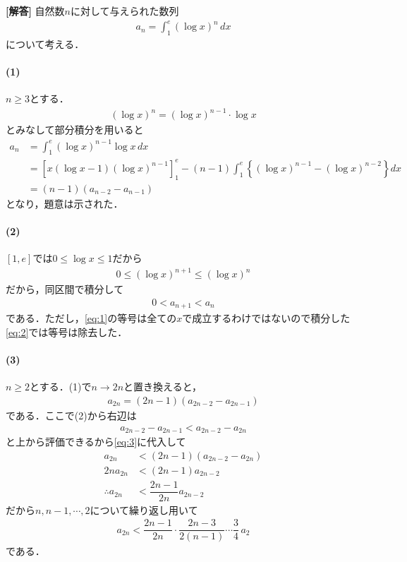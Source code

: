 \documentclass[../../main.tex]{subfiles}
\begin{document}
\begin{oframed}
  
\end{oframed}

{\bf [解答]}
自然数$n$に対して与えられた数列
\begin{align}
  a_n=\displaystyle\int_1^e(\log x)^n\,dx
\end{align}
について考える．

\paragraph{(1)}

$n\ge3$とする．
\begin{align}
  \left(\log x\right)^{n} =  \left(\log x\right)^{n-1}\cdot \log x
\end{align}
とみなして部分積分を用いると
\begin{align}
  a_{n}
  &=\int_1^e(\log x)^{n-1} \log x\, dx \\
  &=\left[x(\log x-1)\left(\log x\right)^{n-1}\right]_{1}^{e} - (n-1)\int_1^e\left\{\left(\log x\right)^{n-1}-\left(\log x\right)^{n-2}\right\}dx \\
  &= (n-1)\left(a_{n-2}-a_{n-1}\right)
\end{align}
となり，題意は示された．

\paragraph{(2)}

$[1,e]$では$0\le\log x\le1$だから
\begin{align}
  0 \le \left(\log x\right)^{n+1} \le \left(\log x\right)^{n} \label{eq:1}
\end{align}
だから，同区間で積分して
\begin{align}
  0 < a_{n+1} < a_{n} \label{eq:2}
\end{align}
である．ただし，\cref{eq:1}の等号は全ての$x$で成立するわけではないので積分した\cref{eq:2}では等号は除去した．

\paragraph{(3)}

$n\ge2$とする．(1)で$n\to 2n$と置き換えると，
\begin{align}
  a_{2n}=(2n-1)(a_{2n-2}-a_{2n-1}) \label{eq:3}
\end{align}
である．ここで(2)から右辺は
\begin{align}
  a_{2n-2}-a_{2n-1}<a_{2n-2}-a_{2n}
\end{align}
と上から評価できるから\cref{eq:3}に代入して
\begin{align}
  a_{2n} &< (2n-1)\left(a_{2n-2}-a_{2n}\right) \\
  2n a_{2n} &< (2n-1)a_{2n-2} \\
  \therefore
  a_{2n} &< \dfrac{2n-1}{2n}a_{2n-2}
\end{align}
だから$n,n-1,\cdots,2$について繰り返し用いて
\begin{align}
  a_{2n}<\dfrac{2n-1}{2n}\cdot\dfrac{2n-3}{2(n-1)}\cdots\dfrac{3}{4}\,a_2 \label{eq:4}
\end{align}
である．
\end{document}
